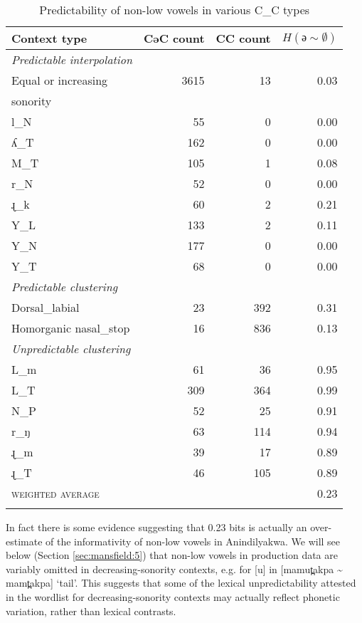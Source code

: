 \documentclass[output=paper,colorlinks,citecolor=brown]{langscibook}
\begin{document}
\begin{table}[t]
\begin{tabular}{l rrr}
\lsptoprule
{Context type} & {CəC count} & {CC count} & $H(\text{ə}\sim\emptyset)$\\
\midrule
\textit{Predictable} \textit{interpolation} &  &  & \\
Equal or increasing & 3615 & 13 & 0.03\\
\quad sonority \\
l\_N & 55 & 0 & 0.00\\
{}ʎ\_T & 162 & 0 & 0.00\\
M\_T & 105 & 1 & 0.08\\
r\_N & 52 & 0 & 0.00\\
{}ɻ\_k & 60 & 2 & 0.21\\
Y\_L & 133 & 2 & 0.11\\
Y\_N & 177 & 0 & 0.00\\
Y\_T & 68 & 0 & 0.00\\
\midrule
\textit{Predictable clustering} &  &  & \\
Dorsal\_labial & 23 & 392 & 0.31\\
Homorganic nasal\_stop & 16 & 836 & 0.13\\
\midrule
\textit{Unpredictable clustering} &  &  & \\
L\_m & 61 & 36 & 0.95\\
L\_T & 309 & 364 & 0.99\\
N\_P & 52 & 25 & 0.91\\
r\_ŋ & 63 & 114 & 0.94\\
{}ɻ\_m & 39 & 17 & 0.89\\
{}ɻ\_T & 46 & 105 & 0.89\\
\midrule
\textsc{weighted average} &  &  & 0.23\\
\lspbottomrule
\end{tabular}
\caption{Predictability of non-low vowels in various \textsc{C\_C} types}
\label{tab:mansfield:4}
\end{table}

In fact there is some evidence suggesting that 0.23 bits is actually an over-estimate of the informativity of non-low vowels in Anindilyakwa. We will see below (Section \ref{sec:mansfield:5}) that non-low vowels in production data are variably omitted in decreasing-sonority contexts, e.g. for [u] in [mamut̪akpa {\textasciitilde} mamt̪akpa] ‘tail’. This suggests that some of the lexical unpredictability attested in the wordlist for decreasing-sonority contexts may actually reflect phonetic variation, rather than lexical contrasts.
\end{document}
